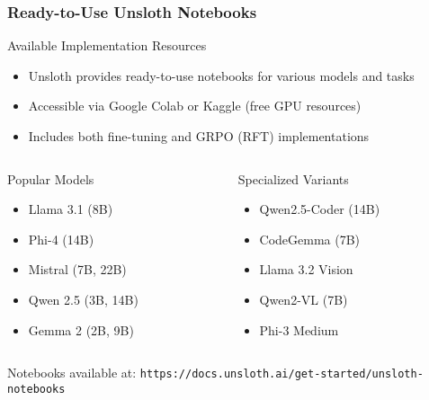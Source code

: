 \documentclass[aspectratio=169]{beamer}
\begin{document}
\begin{frame}
	\frametitle{Ready-to-Use Unsloth Notebooks}
	\begin{block}{Available Implementation Resources}
		\begin{itemize}
			\item Unsloth provides ready-to-use notebooks for various models and tasks
			\item Accessible via Google Colab or Kaggle (free GPU resources)
			\item Includes both fine-tuning and GRPO (RFT) implementations
		\end{itemize}
	\end{block}
	\begin{columns}
		\begin{column}{0.48\textwidth}
			\begin{block}{Popular Models}
				\begin{itemize}
					\item Llama 3.1 (8B)
					\item Phi-4 (14B)
					\item Mistral (7B, 22B)
					\item Qwen 2.5 (3B, 14B)
					\item Gemma 2 (2B, 9B)
				\end{itemize}
			\end{block}
		\end{column}
		\begin{column}{0.48\textwidth}
			\begin{block}{Specialized Variants}
				\begin{itemize}
					\item Qwen2.5-Coder (14B)
					\item CodeGemma (7B)
					\item Llama 3.2 Vision
					\item Qwen2-VL (7B)
					\item Phi-3 Medium
				\end{itemize}
			\end{block}
		\end{column}
	\end{columns}
	\begin{center}
		\small{Notebooks available at: \texttt{https://docs.unsloth.ai/get-started/unsloth-notebooks}}
	\end{center}
\end{frame}
\end{document}
